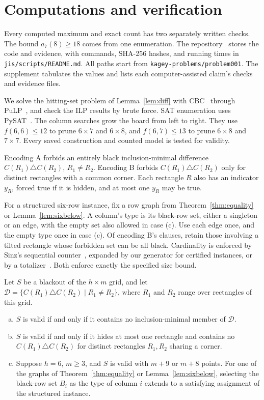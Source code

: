 \section{Computations and verification}\label{sec:verify}

Every computed maximum and exact count has two separately written checks.
The bound $a_7(8)\ge18$ comes from one enumeration. The repository~\cite{repo}
stores the code and evidence, with commands, SHA-256 hashes, and running times in
\nolinkurl{jis/scripts/README.md}. All paths start from
\nolinkurl{kagey-problems/problem001}. The supplement tabulates the values
and lists each computer-assisted claim's checks and evidence files.

We solve the hitting-set problem of Lemma~\ref{lem:diff} with
CBC~\cite{cbc} through PuLP~\cite{pulp}, and check the ILP results by brute force. SAT enumeration uses PySAT~\cite{pysat2018}.
The column searches grow the board from left to right. They use
$f(6,6)\le12$ to prune $6\times7$ and $6\times8$, and
$f(6,7)\le13$ to prune $6\times8$ and $7\times7$.
Every saved construction and counted model is tested for validity.

Encoding A forbids an entirely black inclusion-minimal difference
$C(R_1)\triangle C(R_2)$, $R_1\ne R_2$.
Encoding B forbids $C(R_1)\triangle C(R_2)$ only for distinct
rectangles with a common corner. Each rectangle $R$ also has an
indicator $y_R$, forced true if it is hidden, and at most one $y_R$
may be true.

For a structured six-row instance, fix a row graph from
Theorem~\ref{thm:equality} or Lemma~\ref{lem:sixbelow}. A column's type is
its black-row set, either a singleton or an edge, with the empty set also
allowed in case (c). Use each edge once, and the empty type once in case (c).
Of encoding B's clauses, retain those involving a tilted rectangle
whose forbidden set can be all black. Cardinality is enforced by
Sinz's sequential counter~\cite{sinz2005}, expanded by our generator
for certified instances, or by a totalizer~\cite{bailleux2003}.
Both enforce exactly the specified size bound.

\begin{lemma}\label{lem:enc}
Let $S$ be a blackout of the $h\times m$ grid, and let
$\mathcal D=\{C(R_1)\triangle C(R_2)\mid R_1\ne R_2\}$, where $R_1$ and $R_2$ range over
rectangles of this grid.
\begin{enumerate}[(a)]
\item $S$ is valid if and only if it contains no inclusion-minimal member of $\mathcal D$.
\item $S$ is valid if and only if it hides at most one rectangle and contains no
$C(R_1)\triangle C(R_2)$ for distinct rectangles $R_1,R_2$ sharing a corner.
\item Suppose $h=6$, $m\ge3$, and $S$ is valid with $m+9$ or $m+8$ points. For one of the
graphs of Theorem~\ref{thm:equality} or Lemma~\ref{lem:sixbelow}, selecting the black-row set
$B_i$ as the type of column $i$ extends to a satisfying assignment of the structured instance.
\end{enumerate}
\end{lemma}

